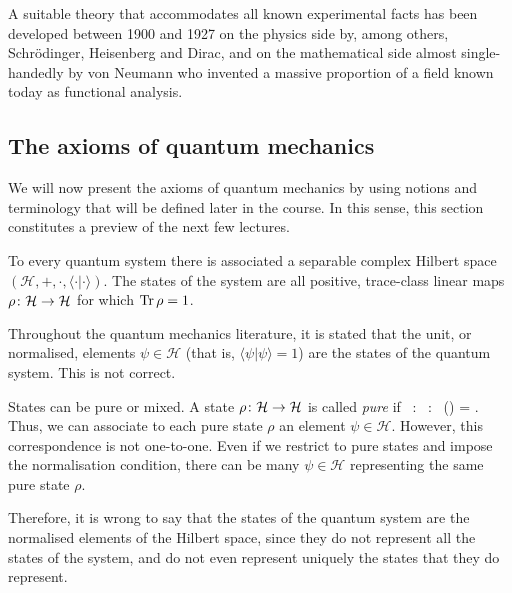 A suitable theory that accommodates all known experimental facts has been developed between 1900 and 1927 on the physics side by, among others, Schr\"odinger, Heisenberg and Dirac, and on the mathematical side almost single-handedly by von Neumann who invented a massive proportion of a field known today as functional analysis.

\subsection{The axioms of quantum mechanics}

We will now present the axioms of quantum mechanics by using notions and terminology that will be defined later in the course. In this sense, this section constitutes a preview of the next few lectures. 

\begin{tcolorbox}[colframe=blue!10!black,before skip=10pt,after skip=10pt]
\begin{axiom}
To every quantum system there is associated a separable complex Hilbert space $(\mathcal{H},+,\cdot,\langle \cdot | \cdot \rangle)$. The states of the system are all positive, trace-class linear maps $\rho\colon \mathcal{H}\to \mathcal{H}$ for which $\Tr\rho=1$.
\end{axiom}
\end{tcolorbox}

\br
Throughout the quantum mechanics literature, it is stated that the unit, or normalised, elements $\psi\in\mathcal{H}$ (that is, $\langle\psi|\psi\rangle=1$) are the states of the quantum system. This is not correct. 

States can be pure or mixed. A state $\rho\colon \mathcal{H}\to \mathcal{H}$ is called \emph{pure} if
\bse
\exists \, \psi\in {} : \forall \, \alpha\in {} : \ \rho(\alpha) = \frac{\langle\psi|\alpha\rangle}{\langle\psi|\psi\rangle}\psi.
\ese
Thus, we can associate to each pure state $\rho$ an element $\psi\in\mathcal{H}$. However, this correspondence is not one-to-one. Even if we restrict to pure states and impose the normalisation condition, there can be many $\psi\in\mathcal{H}$ representing the same pure state $\rho$. 

Therefore, it is wrong to say that the states of the quantum system are the normalised elements of the Hilbert space, since they do not represent all the states of the system, and do not even represent uniquely the states that they do represent.
\er

